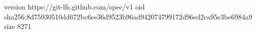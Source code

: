 version https://git-lfs.github.com/spec/v1
oid sha256:8d75930510dd672bc6ee36d9523b96ad942074799172d96ed2ca95e3be6984a9
size 8271
